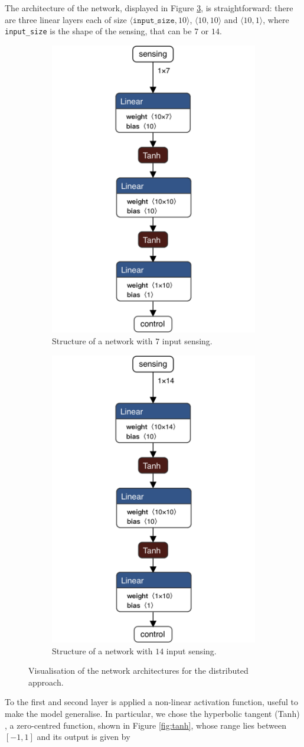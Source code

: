 The architecture of the network, displayed in Figure 
\ref{fig:singlenetdistributed1}, is straightforward: there are three linear 
layers each of size $\langle\mathtt{input\_size}, 10\rangle$,  $\langle 10, 
10\rangle$ and $\langle 10, 1\rangle$, where \texttt{input\_size} is the 
shape of the sensing, that can be $7$ or $14$.

\begin{figure}[htb]
	\centering
	\begin{subfigure}[h]{0.495\textwidth}
		\centering
		\includegraphics[width=.3\textwidth]{contents/images/task1distributed@4x}%
		\caption{Structure of a network with $7$ input sensing.}
		\label{fig:singlenet7distributed1}
	\end{subfigure}
	\hfill
	\begin{subfigure}[h]{0.495\textwidth}
		\centering
		\includegraphics[width=.3\textwidth]{contents/images/task1distributed_all@4x}
		\caption{Structure of a network with $14$ input sensing.}
		\label{fig:singlenet14distributed1}
	\end{subfigure}
	\caption[Network architectures for the distributed approach.]{Visualisation of 
	the network architectures for the distributed approach.}
	\label{fig:singlenetdistributed1}
\end{figure}

To the first and second layer is applied a non-linear activation function, 
useful to make the model generalise. 
In particular, we chose the hyperbolic tangent (Tanh) 
\cite[see][]{kalman1992tanh}, a zero-centred function, shown in Figure 
\ref{fig:tanh}, whose range lies between $[-1, 1]$ and its output is given by

